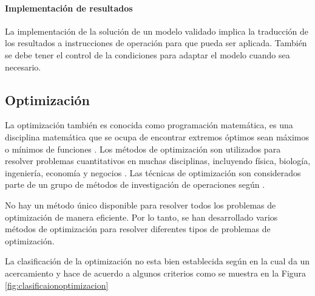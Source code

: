 \paragraph{Implementación de resultados}
La implementación de la solución de un modelo validado implica la traducción de los resultados a instrucciones de operación para que pueda ser aplicada. También se debe tener el control de la condiciones para adaptar el modelo cuando sea necesario. \cite{CabreraGarcia2013IntroduccionYouTube}

\subsection{Optimización}
La optimización también es conocida como programación matemática, es una disciplina matemática que se ocupa de encontrar extremos óptimos sean máximos o mínimos de funciones \cite{Collette2003MultiobjectiveStudies}. Los métodos de optimización son utilizados para resolver problemas cuantitativos en muchas disciplinas, incluyendo física, biología, ingeniería, economía y negocios \cite{WrightOptimizationMathematics}. Las técnicas de optimización son considerados parte de un grupo de métodos de investigación de operaciones según .

No hay un método único disponible para resolver todos los problemas de optimización de manera eficiente. Por lo tanto, se han desarrollado varios métodos de optimización para resolver diferentes tipos de problemas de optimización. \cite{Rao2009EngineeringPractice}

La clasificación de la optimización no esta bien establecida según  en la cual da un acercamiento y hace de acuerdo a algunos criterios como se muestra en la Figura \ref{fig:clasificaionoptimizacion}

